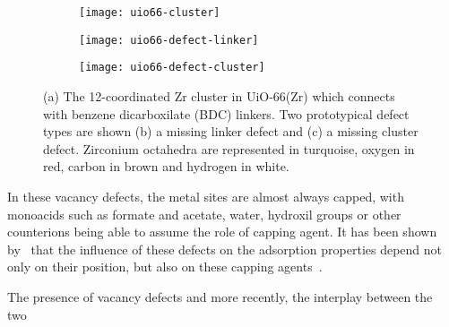 \begin{figure}[htb]
    \centering

	\begin{subfigure}{0.3\linewidth}
		\parbox[c]{0.15\linewidth}{\caption{}%
			\label{defects:fgr:uio66-cluster}}%
		\parbox[b]{0.85\linewidth}{%
			\texttt{[image: uio66-cluster]}%
        }%
    \end{subfigure}
	\begin{subfigure}{0.3\linewidth}
		\parbox[c]{0.15\linewidth}{\caption{}%
			\label{defects:fgr:uio66-defect-linker}}%
		\parbox[b]{0.85\linewidth}{%
			\texttt{[image: uio66-defect-linker]}%
        }%
    \end{subfigure}
    \begin{subfigure}{0.3\linewidth}
		\parbox[c]{0.15\linewidth}{\caption{}%
			\label{defects:fgr:uio66-defect-cluster}}%
		\parbox[b]{0.85\linewidth}{%
			\texttt{[image: uio66-defect-cluster]}%
        }%
    \end{subfigure}

    \caption{(a) The 12-coordinated Zr cluster in UiO-66(Zr)
    which connects with benzene dicarboxilate (BDC) linkers.
    Two prototypical defect types are shown (b) a missing
    linker defect and (c) a missing cluster defect. Zirconium
    octahedra are represented in turquoise, oxygen in red, 
    carbon in brown and hydrogen in white.}%
    \label{defects:fgr:uio66}
    
\end{figure}

In these vacancy defects, the metal sites are almost always capped, 
with monoacids such as formate and acetate, water, hydroxil groups 
or other counterions being able 
to assume the role of capping agent. It has been shown 
by~\citeauthor{thorntonDefectsMetalOrganic2016} that the influence 
of these defects on the adsorption properties depend not only 
on their position, but also on these capping 
agents~\cite{thorntonDefectsMetalOrganic2016}.

The presence of vacancy defects and more recently, 
the interplay between the two~\cite{taddeiPostsyntheticLigandExchange2018}